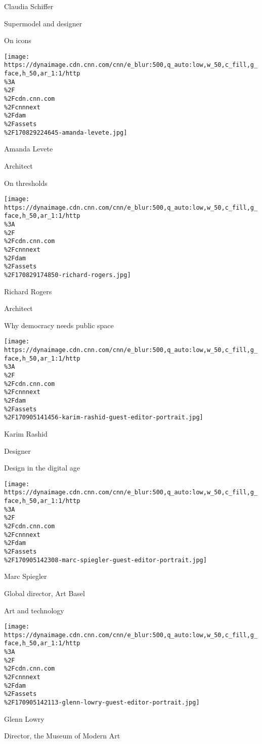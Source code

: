 Claudia Schiffer

Supermodel and designer

On icons

\href{/style/profiles/amanda-levete}{}

\texttt{[image: https://dynaimage.cdn.cnn.com/cnn/e\_blur:500,q\_auto:low,w\_50,c\_fill,g\_face,h\_50,ar\_1:1/http\\\%3A\\\%2F\\\%2Fcdn.cnn.com\\\%2Fcnnnext\\\%2Fdam\\\%2Fassets\\\%2F170829224645-amanda-levete.jpg]}

Amanda Levete

Architect

On thresholds

\href{/style/profiles/richard-rogers}{}

\texttt{[image: https://dynaimage.cdn.cnn.com/cnn/e\_blur:500,q\_auto:low,w\_50,c\_fill,g\_face,h\_50,ar\_1:1/http\\\%3A\\\%2F\\\%2Fcdn.cnn.com\\\%2Fcnnnext\\\%2Fdam\\\%2Fassets\\\%2F170829174850-richard-rogers.jpg]}

Richard Rogers

Architect

Why democracy needs public space

\href{/style/profiles/karim-rashid}{}

\texttt{[image: https://dynaimage.cdn.cnn.com/cnn/e\_blur:500,q\_auto:low,w\_50,c\_fill,g\_face,h\_50,ar\_1:1/http\\\%3A\\\%2F\\\%2Fcdn.cnn.com\\\%2Fcnnnext\\\%2Fdam\\\%2Fassets\\\%2F170905141456-karim-rashid-guest-editor-portrait.jpg]}

Karim Rashid

Designer

Design in the digital age

\href{/style/profiles/marc-spiegler}{}

\texttt{[image: https://dynaimage.cdn.cnn.com/cnn/e\_blur:500,q\_auto:low,w\_50,c\_fill,g\_face,h\_50,ar\_1:1/http\\\%3A\\\%2F\\\%2Fcdn.cnn.com\\\%2Fcnnnext\\\%2Fdam\\\%2Fassets\\\%2F170905142308-marc-spiegler-guest-editor-portrait.jpg]}

Marc Spiegler

Global director, Art Basel

Art and technology

\href{/style/profiles/glenn-lowry}{}

\texttt{[image: https://dynaimage.cdn.cnn.com/cnn/e\_blur:500,q\_auto:low,w\_50,c\_fill,g\_face,h\_50,ar\_1:1/http\\\%3A\\\%2F\\\%2Fcdn.cnn.com\\\%2Fcnnnext\\\%2Fdam\\\%2Fassets\\\%2F170905142113-glenn-lowry-guest-editor-portrait.jpg]}

Glenn Lowry

Director, the Museum of Modern Art

